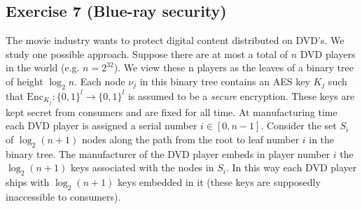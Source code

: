 \subsection{Exercise 7 (Blue-ray security)}
The movie industry wants to protect digital content distributed on DVD's. We study
one possible approach. Suppose there are at most a total of $n$ DVD players in the world (e.g.
$n=2^{32}$). We view these n players as the leaves of a binary tree of height $\log_2 n$. 
Each node $\nu_j$ in this binary tree contains an AES key $K_j$ such that 
$\mathrm{Enc}_{K_j}:\{0,1\}^l\rightarrow\{0,1\}^l$ is assumed to be a \emph{secure} encryption. 
These keys are kept secret from consumers and are fixed for all time. 
At manufacturing time each DVD player is assigned a serial number $i\in\left[0,n-1\right]$.
Consider the set $S_i$ of $\log_2(n+1)$ nodes along the path from the root to leaf number
$i$ in the binary tree. The manufacturer of the DVD player embeds in player number $i$ the
$\log_2(n+1)$ keys associated with the nodes in $S_i$. In this way each DVD player ships with 
$\log_2(n+1)$ keys embedded in it (these keys are supposedly inaccessible to consumers).

